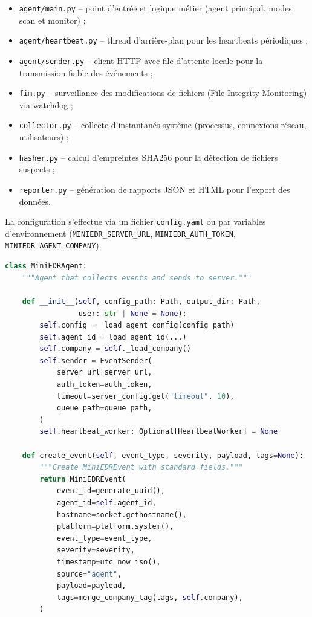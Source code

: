 \begin{itemize}
  \item \texttt{agent/main.py} -- point d'entrée et logique métier
    (agent principal, modes scan et monitor) ;
  \item \texttt{agent/heartbeat.py} -- thread d'arrière-plan pour les
    heartbeats périodiques ;
  \item \texttt{agent/sender.py} -- client HTTP avec file d'attente
    locale pour la transmission fiable des événements ;
  \item \texttt{fim.py} -- surveillance des modifications de
    fichiers (File Integrity Monitoring) via watchdog ;
  \item \texttt{collector.py} -- collecte d'instantanés système
    (processus, connexions réseau, utilisateurs) ;
  \item \texttt{hasher.py} -- calcul d'empreintes SHA256 pour la
    détection de fichiers suspects ;
  \item \texttt{reporter.py} -- génération de rapports JSON et HTML
    pour l'export des données.
\end{itemize}

La configuration s'effectue via un fichier \texttt{config.yaml} ou par
variables d'environnement (\texttt{MINIEDR\_SERVER\_URL},
\texttt{MINIEDR\_AUTH\_TOKEN}, \texttt{MINIEDR\_AGENT\_COMPANY}).

\begin{lstlisting}[language=Python, caption={Structure de la classe MiniEDRAgent}, label={lst:agent-class}]
class MiniEDRAgent:
    """Agent that collects events and sends to server."""

    def __init__(self, config_path: Path, output_dir: Path,
                 user: str | None = None):
        self.config = _load_agent_config(config_path)
        self.agent_id = load_agent_id(...)
        self.company = self._load_company()
        self.sender = EventSender(
            server_url=server_url,
            auth_token=auth_token,
            timeout=server_config.get("timeout", 10),
            queue_path=queue_path,
        )
        self.heartbeat_worker: Optional[HeartbeatWorker] = None

    def create_event(self, event_type, severity, payload, tags=None):
        """Create MiniEDREvent with standard fields."""
        return MiniEDREvent(
            event_id=generate_uuid(),
            agent_id=self.agent_id,
            hostname=socket.gethostname(),
            platform=platform.system(),
            event_type=event_type,
            severity=severity,
            timestamp=utc_now_iso(),
            source="agent",
            payload=payload,
            tags=merge_company_tag(tags, self.company),
        )
\end{lstlisting}

